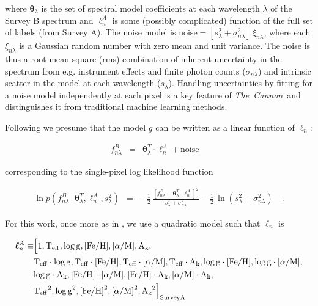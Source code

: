 \documentclass[12pt, letterpaper, preprint]{aastex}
\newcommand{\tc}{\textsl{The~Cannon}}
\newcommand{\set}[1]{\bm{#1}}
\newcommand{\teff}{\mbox{$\rm T_{eff}$}}
\newcommand{\feh}{\mbox{$\rm [Fe/H]$}}
\newcommand{\alpham}{\mbox{$\rm [\alpha/M]$}}
\newcommand{\logg}{\mbox{$\rm \log g$}}
\newcommand{\ak}{\mbox{$\rm A_k$}}
\newcommand{\starlabel}{\ell}
\newcommand{\starlabelvec}{\set{\starlabel}}
\newcommand{\given}{\,|\,}
\begin{document}
\noindent where $\set{\theta}_\lambda$ is the set of 
spectral model coefficients at each wavelength $\lambda$ of the Survey B spectrum and
$\starlabelvec^A_n$ is some (possibly complicated) function of the full set of labels (from Survey A). 
The noise model is $\mbox{noise} = [s_\lambda^2+ \sigma_{n\lambda}^2]\,\xi_{n\lambda}$,
where each $\xi_{n\lambda}$ is a Gaussian random number with zero mean and unit variance. 
The noise is thus a root-mean-square (rms) combination of inherent uncertainty in the spectrum
from e.g. instrument effects and finite photon counts ($\sigma_{n\lambda}$) and 
intrinsic scatter in the model at each wavelength ($s_\lambda$). 
Handling uncertainties by fitting for a noise model
independently at each pixel is a key feature of \tc\ and 
distinguishes it from traditional machine learning methods. 

Following \citet{Ness2015} we presume that the model $g$ can be written 
 as a linear function of $\starlabelvec_n$: 

\begin{eqnarray}
f_{n\lambda}^B &=&
\set{\theta}_\lambda^T \cdot \starlabelvec^A_n + \mbox{noise}
\label{eq:linearmodel}\quad
\end{eqnarray}

\noindent corresponding to the single-pixel log likelihood function

\begin{eqnarray}
\ln p(f_{n\lambda}^B\given\set{\theta}^T_\lambda, \starlabelvec^A_n, s_\lambda^2) &=&
 -\frac{1}{2}\,\frac{[f_{n\lambda}^B - \set{\theta}^T_\lambda \cdot \starlabelvec^A_n]^2}{s_\lambda^2 + \sigma_{n\lambda}^2}
 -\frac{1}{2}\,\ln(s_\lambda^2 + \sigma_{n\lambda}^2)
\label{eq:like}\quad.
\end{eqnarray}

\noindent For this work, once more as in \citet{Ness2015}, 
we use a quadratic model such that $\starlabelvec_n$ is  

\begin{equation}
\begin{aligned}
\starlabelvec^A_n \equiv 
& \Bigl [1, \teff, \logg, \feh, \alpham, \ak, \\
& \teff\cdot\logg, \teff\cdot\feh, \teff\cdot\alpham, \teff\cdot\ak, \logg\cdot\feh, \logg\cdot\alpham, \\
& \logg\cdot\ak, \feh\cdot\alpham, \feh\cdot\ak,
\alpham\cdot\ak, \\
& \teff^2, \logg^2, \feh^2, \alpham^2, \ak^2  \Bigr 
]_{\mathrm{Survey A}}
\label{eq:quadinthreelabels}
\end{aligned}
\end{equation}
\end{document}
